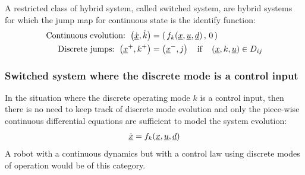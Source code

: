 A restricted class of hybrid system, called switched system, are hybrid systems for which the jump map for continuous state is the identify function:
%
\begin{align}
\text{Continuous evolution: } \left(  \dot{\underline{x}} , \dot{k} \right) &=  \left( \, f_k( \underline{x} , \underline{u} , \underline{d} ) \, , \, 0 \, \right) \\
\text{Discrete jumps: } \left(  \underline{x}^+ , k^+ \right) &=  \left( \underline{x}^- , j \right) \quad\text{if}\quad \left(  \underline{x} , k , \underline{u} \right) \in D_{ij} 
\end{align}
%

\subsubsection{Switched system where the discrete mode is a control input}

In the situation where the discrete operating mode $k$ is a control input, then there is no need to keep track of discrete mode evolution and only the piece-wise continuous differential equations are sufficient to model the system evolution:
%
\begin{align}
\dot{\underline{x}} = f_k( \underline{x} , \underline{u} , \underline{d} ) 
\end{align}
%
A robot with a continuous dynamics but with a control law using discrete modes of operation would be of this category. 









